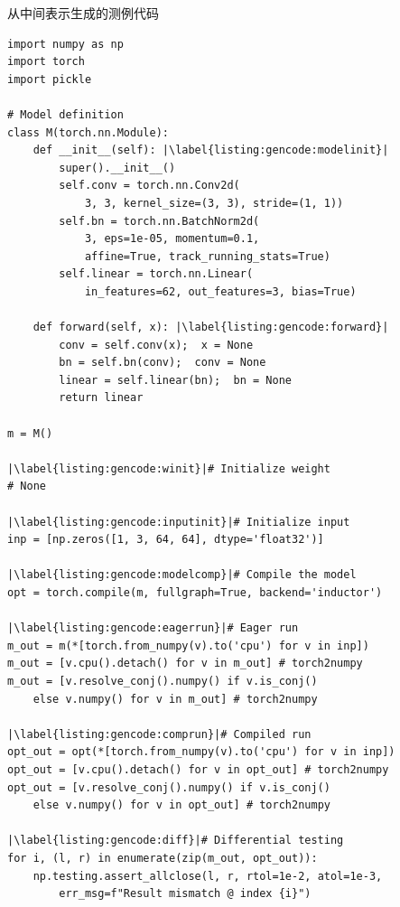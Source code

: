 \begin{listing}[]
    \caption{从中间表示生成的测例代码}
    \label{listing:gencode}
\begin{verbatim}
import numpy as np
import torch
import pickle

# Model definition
class M(torch.nn.Module):
    def __init__(self): |\label{listing:gencode:modelinit}|
        super().__init__()
        self.conv = torch.nn.Conv2d(
            3, 3, kernel_size=(3, 3), stride=(1, 1))
        self.bn = torch.nn.BatchNorm2d(
            3, eps=1e-05, momentum=0.1,
            affine=True, track_running_stats=True)
        self.linear = torch.nn.Linear(
            in_features=62, out_features=3, bias=True)

    def forward(self, x): |\label{listing:gencode:forward}|
        conv = self.conv(x);  x = None
        bn = self.bn(conv);  conv = None
        linear = self.linear(bn);  bn = None
        return linear

m = M()

|\label{listing:gencode:winit}|# Initialize weight
# None

|\label{listing:gencode:inputinit}|# Initialize input
inp = [np.zeros([1, 3, 64, 64], dtype='float32')]

|\label{listing:gencode:modelcomp}|# Compile the model
opt = torch.compile(m, fullgraph=True, backend='inductor')

|\label{listing:gencode:eagerrun}|# Eager run
m_out = m(*[torch.from_numpy(v).to('cpu') for v in inp])
m_out = [v.cpu().detach() for v in m_out] # torch2numpy
m_out = [v.resolve_conj().numpy() if v.is_conj()
    else v.numpy() for v in m_out] # torch2numpy

|\label{listing:gencode:comprun}|# Compiled run
opt_out = opt(*[torch.from_numpy(v).to('cpu') for v in inp])
opt_out = [v.cpu().detach() for v in opt_out] # torch2numpy
opt_out = [v.resolve_conj().numpy() if v.is_conj()
    else v.numpy() for v in opt_out] # torch2numpy

|\label{listing:gencode:diff}|# Differential testing
for i, (l, r) in enumerate(zip(m_out, opt_out)):
    np.testing.assert_allclose(l, r, rtol=1e-2, atol=1e-3,
        err_msg=f"Result mismatch @ index {i}")
\end{verbatim}
\end{listing}
